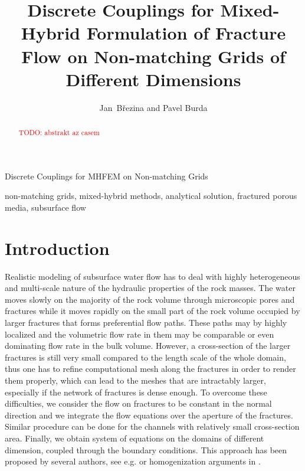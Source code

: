 \documentclass[times]{nlaauth}%
\def\todo#1{\textcolor{red}{TODO: #1} }
\begin{document}
 

\title
{Discrete Couplings for Mixed-Hybrid Formulation of Fracture Flow on Non-matching Grids of Different Dimensions}
\author{
Jan~B{\v r}ezina and
Pavel Burda
}
{Discrete Couplings for MHFEM on Non-matching Grids}
\address{
Faculty of Mechatronics, Informatics and Interdisciplinary Studies,
Technical University of Liberec,
H\'alkova~6,~461~17~Liberec~1, Czech Republic
\break{}
TBD
}
%
\begin{abstract}
\todo{abstrakt az casem}
\end{abstract}
%
\keywords
{non-matching grids, mixed-hybrid methods, analytical solution, fractured porous media, subsurface flow}%
%
\maketitle


\section{Introduction}
Realistic modeling of subsurface water flow has to deal with highly heterogeneous and multi-scale nature of the
hydraulic properties of the rock masses. The water moves slowly on the majority of the rock volume through
microscopic pores and fractures while it moves rapidly on the small part of the rock volume occupied by larger fractures
that forms preferential flow paths. These paths may by highly localized and the volumetric flow 
rate in them may be comparable or even dominating flow rate in the bulk volume. However, 
a cross-section of the larger fractures is still 
very small compared to the length scale of the whole domain, thus one has to refine computational mesh along the fractures 
in order to render them properly, 
which can lead to the meshes that are intractably larger, especially if  the network of fractures is dense enough. 
To overcome these difficulties, we consider the flow on fractures to be constant in the normal direction
and we integrate the flow equations over the aperture of the fractures. Similar procedure can be done for the channels
 with relatively
small cross-section area. Finally, we obtain system of equations on the domains of different dimension, coupled through the boundary 
conditions. This approach has been proposed by several authors, see e.g. \cite{reichenberger_mixed-dimensional_2006} or
homogenization arguments in \cite{martin_modeling_2005}.  
\end{document}
